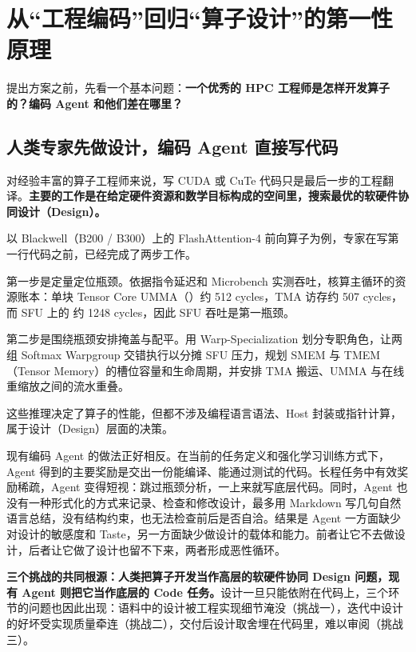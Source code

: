 \section{从“工程编码”回归“算子设计”的第一性原理}\label{sec:first-principles}
提出方案之前，先看一个基本问题：\textbf{一个优秀的 HPC 工程师是怎样开发算子的？编码 Agent 和他们差在哪里？}


\subsection{人类专家先做设计，编码 Agent 直接写代码}\label{sec:design-first}
对经验丰富的算子工程师来说，写 CUDA 或 CuTe 代码只是最后一步的工程翻译。\textbf{主要的工作是在给定硬件资源和数学目标构成的空间里，搜索最优的软硬件协同设计（Design）。}


以 Blackwell（B200 / B300）上的 FlashAttention-4 前向算子为例，专家在写第一行代码之前，已经完成了两步工作。


第一步是定量定位瓶颈。依据指令延迟和 Microbench 实测吞吐，核算主循环的资源账本：单块 Tensor Core UMMA（）约 512 cycles，TMA 访存约 507 cycles，而 SFU 上的  约 1248 cycles，因此 SFU 吞吐是第一瓶颈。


第二步是围绕瓶颈安排掩盖与配平。用 Warp-Specialization 划分专职角色，让两组 Softmax Warpgroup 交错执行以分摊 SFU 压力，规划 SMEM 与 TMEM（Tensor Memory）的槽位容量和生命周期，并安排 TMA 搬运、UMMA 与在线重缩放之间的流水重叠。


这些推理决定了算子的性能，但都不涉及编程语言语法、Host 封装或指针计算，属于设计（Design）层面的决策。


\begin{DiagramBlock}
\end{DiagramBlock}
现有编码 Agent 的做法正好相反。在当前的任务定义和强化学习训练方式下，Agent 得到的主要奖励是交出一份能编译、能通过测试的代码。长程任务中有效奖励稀疏，Agent 变得短视：跳过瓶颈分析，一上来就写底层代码。同时，Agent 也没有一种形式化的方式来记录、检查和修改设计，最多用 Markdown 写几句自然语言总结，没有结构约束，也无法检查前后是否自洽。结果是 Agent 一方面缺少对设计的敏感度和 Taste，另一方面缺少做设计的载体和能力。前者让它不去做设计，后者让它做了设计也留不下来，两者形成恶性循环。


\textbf{三个挑战的共同根源：人类把算子开发当作高层的软硬件协同 Design 问题，现有 Agent 则把它当作底层的 Code 任务。}设计一旦只能依附在代码上，三个环节的问题也因此出现：语料中的设计被工程实现细节淹没（挑战一），迭代中设计的好坏受实现质量牵连（挑战二），交付后设计取舍埋在代码里，难以审阅（挑战三）。


